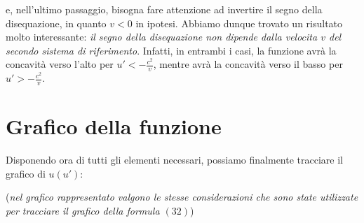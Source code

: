 \documentclass{article}
\begin{document}
e, nell'ultimo passaggio, bisogna fare attenzione
ad invertire il segno della disequazione, in quanto
\(v < 0\) in ipotesi. Abbiamo dunque trovato un risultato
molto interessante: \textit{il segno della disequazione
non dipende dalla velocita \(v\) del secondo sistema di
riferimento}. Infatti, in entrambi i casi, la funzione
avrà la concavità verso l'alto per \(u' < - \frac{c^2}{v}\),
mentre avrà la concavità verso il basso per \(u' > - \frac{c^2}{v}\).

\section{Grafico della funzione}
Disponendo ora di tutti gli elementi necessari,
possiamo finalmente tracciare il grafico di \(u(u')\):

\begin{center}
\end{center}

(\textit{nel grafico rappresentato valgono le stesse
considerazioni che sono state utilizzate per
tracciare il grafico della formula \((32)\)})\hfill\break
\end{document}
